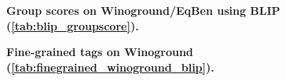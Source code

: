 \documentclass{article} \usepackage{iclr2024_conference,times}
\begin{document}
{\bf Group scores on Winoground/EqBen using BLIP (\autoref{tab:blip_groupscore}).} 

\begin{table}[h]
\centering
{}
\caption{\small Performance comparison of BLIP's ITCScore, ITMScore, and -tuned VisualGPTScore on Winoground (all) and EqBen (val). }
\label{tab:blip_groupscore}
\end{table}

{\bf Fine-grained tags on Winoground (\autoref{tab:finegrained_winoground_blip}).} 
\end{document}
